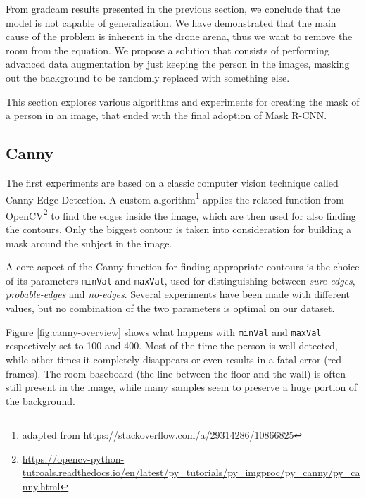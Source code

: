 From \gls{gradcam} results presented in the previous section, we conclude that the model is not capable of generalization. We have demonstrated that the main cause of the problem is inherent in the drone arena, thus we want to remove the room from the equation. We propose a solution that consists of performing advanced data augmentation by just keeping the person in the images, masking out the background to be randomly replaced with something else.

This section explores various algorithms and experiments for creating the mask of a person in an image, that ended with the final adoption of Mask R-CNN.



\subsection{Canny}
\label{subsec:masking-canny}

The first experiments are based on a classic computer vision technique called Canny Edge Detection. A custom algorithm\footnote{adapted from \url{https://stackoverflow.com/a/29314286/10866825}} applies the related function from OpenCV\footnote{\url{https://opencv-python-tutroals.readthedocs.io/en/latest/py_tutorials/py_imgproc/py_canny/py_canny.html}} to find the edges inside the image, which are then used for also finding the contours. Only the biggest contour is taken into consideration for building a mask around the subject in the image.

\medskip

A core aspect of the Canny function for finding appropriate contours is the choice of its parameters \texttt{minVal} and \texttt{maxVal}, used for distinguishing between \textit{sure-edges}, \textit{probable-edges} and \textit{no-edges}. Several experiments have been made with different values, but no combination of the two parameters is optimal on our dataset.

Figure \ref{fig:canny-overview} shows what happens with \texttt{minVal} and \texttt{maxVal} respectively set to 100 and 400. Most of the time the person is well detected, while other times it completely disappears or even results in a fatal error (red frames). The room baseboard (the line between the floor and the wall) is often still present in the image, while many samples seem to preserve a huge portion of the background.

